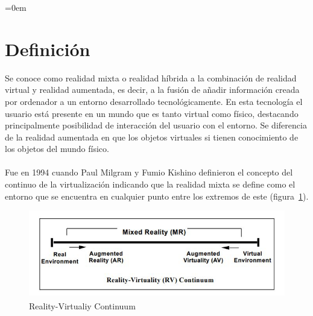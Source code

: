 \parindent=0em
\section{Definición}
\noindent



Se conoce como realidad mixta o realidad híbrida a la combinación de realidad virtual y realidad aumentada, es decir, a la fusión de añadir información creada por ordenador a un entorno desarrollado tecnológicamente. En esta tecnología el usuario está presente en un mundo que es tanto virtual como físico, destacando principalmente posibilidad de interacción del usuario con el entorno. Se diferencia de la realidad aumentada en que los objetos virtuales si tienen conocimiento de los objetos del mundo físico.
\\\\
Fue en 1994 cuando Paul Milgram y Fumio Kishino definieron el concepto del continuo de la virtualización \cite{ARDisplayofContinuum} indicando que la realidad mixta se define como el entorno que se encuentra en cualquier punto entre los extremos de este (figura~\ref{fig:rvcontinuumfig}).

\begin{figure}[h]
    \centering
    \includegraphics{Images/Estado del arte/rvcontinuum.JPG}
    \caption{Reality-Virtualiy Continuum\textsuperscript{\cite{ARDisplayofContinuum}}}
    \label{fig:rvcontinuumfig}
\end{figure}






